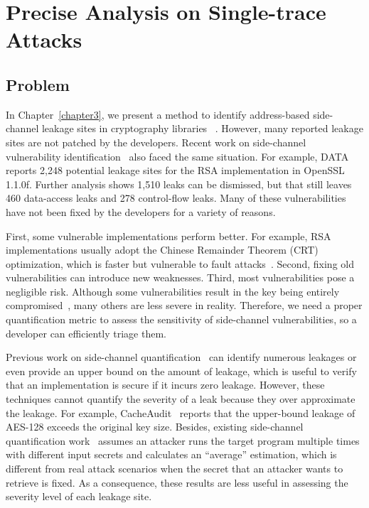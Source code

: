 
\chapter{Precise Analysis on Single-trace Attacks}\label{chapter4}

\section{Problem}
In Chapter~\ref{chapter3}, we present a method to identify address-based side-channel leakage sites in cryptography libraries ~\cite{Osvik2006,Gullasch:2011:CGB:2006077.2006784,203878,10.1007/978-3-540-45238-6_6}. However, many reported leakage sites are not patched by the developers. Recent work on side-channel vulnerability identification~\cite{203878,217537,Wichelmann:2018:MFF:3274694.3274741,Brotzman19Casym,236338,182946} also faced the same situation. For example, DATA~\cite{217537} reports 2,248 potential leakage sites for the RSA implementation in OpenSSL 1.1.0f\@. Further analysis shows 1,510 leaks can be dismissed, but that still leaves 460 data-access leaks and 278 control-flow leaks. Many of these vulnerabilities have not been fixed by the developers for a variety of reasons.

First, some vulnerable implementations perform better. For example,
RSA implementations usually adopt the Chinese Remainder Theorem (CRT) optimization, which is faster but vulnerable to fault attacks~\cite{aumuller2002fault}. Second, fixing old vulnerabilities can introduce new
weaknesses. Third, most vulnerabilities pose a negligible risk. Although some vulnerabilities result in the key being entirely compromised~\cite{184415, aumuller2002fault}, many others are less severe in reality. Therefore, we need a proper quantification metric to assess the sensitivity of side-channel vulnerabilities, so a developer can efficiently triage them.

Previous work on side-channel quantification~\cite{182946,5207642} can identify numerous leakages or even provide an upper bound on the amount of leakage, which is useful to verify that an implementation is secure if it incurs zero leakage.
However, these techniques cannot quantify the severity of a leak because they over approximate the leakage. For example, CacheAudit~\cite{182946}
reports that the upper-bound leakage of AES-128 exceeds the original key size. Besides, existing side-channel quantification work~\cite{182946,5207642} assumes an attacker runs the target program multiple times with different
input secrets and calculates an ``average'' estimation, which is different from real attack scenarios when the secret that an attacker wants to retrieve is fixed. As a consequence, these results are less useful in assessing the severity level of each leakage site.

